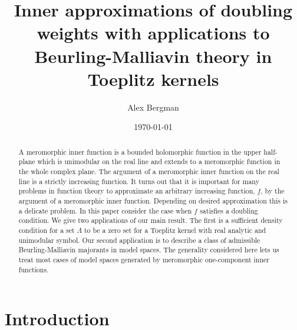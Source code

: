 \documentclass{article}[12pt]
\author{Alex Bergman}
\title{Inner approximations of doubling weights with applications to Beurling-Malliavin theory in Toeplitz kernels}
\date{\today}
\theoremstyle{remark}
\begin{document}
\maketitle

\begin{abstract}
    A meromorphic inner function is a bounded holomorphic function in the upper half-plane which is unimodular on the real line and extends to a meromorphic function in the whole complex plane. The argument of a meromorphic inner function on the real line is a strictly increasing function. It turns out that it is important for many problems in function theory to approximate an arbitrary increasing function, $f$, by the argument of a meromorphic inner function. Depending on desired approximation this is a delicate problem. In this paper consider the case when $f$ satisfies a doubling condition. We give two applications of our main result. The first is a sufficient density condition for a set $\Lambda$ to be a zero set for a Toeplitz kernel with real analytic and unimodular symbol. Our second application is to describe a class of admissible Beurling-Malliavin majorants in model spaces. The generality considered here lets us treat most cases of model spaces generated by meromorphic one-component inner functions.
\end{abstract}

\section{Introduction}
\end{document}
